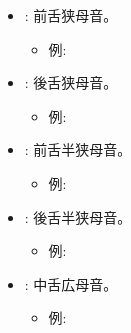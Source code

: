 \begin{itemize}
    \item \textbf{}: 前舌狭母音。
    \begin{itemize}
        \item 例: %
    \end{itemize}

    \item \textbf{}: 後舌狭母音。
    \begin{itemize}
        \item 例: %
    \end{itemize}

    \item \textbf{}: 前舌半狭母音。
    \begin{itemize}
        \item 例: %
    \end{itemize}

    \item \textbf{}: 後舌半狭母音。
    \begin{itemize}
        \item 
例: %
    \end{itemize}

    \item \textbf{}: 中舌広母音。
    \begin{itemize}
        \item 例: %
    \end{itemize}
\end{itemize}